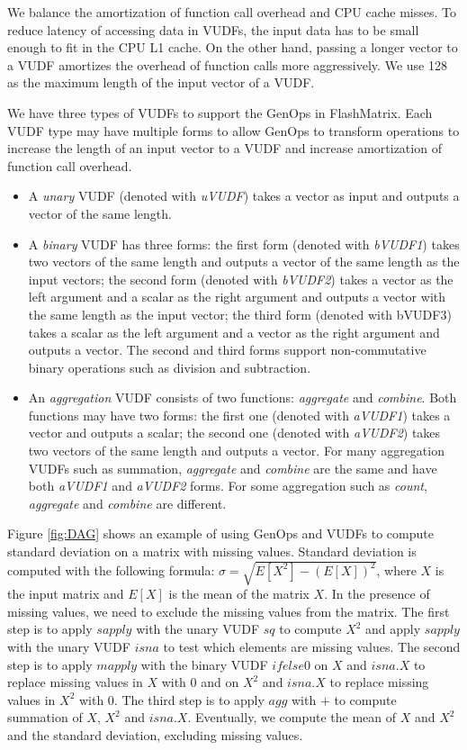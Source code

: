 We balance the amortization of function call overhead and CPU cache misses.
To reduce latency of accessing data in VUDFs,
the input data has to be small enough to fit in the CPU L1 cache. On the
other hand, passing a longer vector to a VUDF amortizes the overhead of
function calls more aggressively. We use 128 as the maximum length of
the input vector of a VUDF. %

We have three types of VUDFs to support the GenOps in FlashMatrix. Each VUDF
type may have multiple forms to allow GenOps to transform operations to
increase the length of an input vector to a VUDF and increase amortization
of function call overhead.
\begin{itemize}
	\item A \textit{unary} VUDF (denoted with \textit{uVUDF}) takes a vector
		as input and outputs a vector of the same length.
	\item A \textit{binary} VUDF has three forms: the first form (denoted with
		\textit{bVUDF1}) takes two vectors of the same length and outputs
		a vector of the same length as the input vectors; the second form (denoted
		with \textit{bVUDF2}) takes a vector as the left argument and a scalar
		as the right argument and outputs a vector with the same length as
		the input vector; the third form (denoted with bVUDF3) takes a scalar
		as the left argument and a vector as the right argument and outputs
		a vector. The second and third forms support non-commutative binary
		operations such as division and subtraction.
	\item An \textit{aggregation} VUDF consists of two functions:
		\textit{aggregate} and \textit{combine}. Both functions may have two
		forms: the first one (denoted with \textit{aVUDF1}) takes a vector and
		outputs a scalar; the second one (denoted with \textit{aVUDF2}) takes
		two vectors of the same length and outputs a vector. For many
		aggregation VUDFs such as summation, \textit{aggregate} and
		\textit{combine} are the same and have both \textit{aVUDF1} and
		\textit{aVUDF2} forms. For some aggregation such as \textit{count},
		\textit{aggregate} and \textit{combine} are different.
\end{itemize}

Figure \ref{fig:DAG} shows an example of using GenOps and VUDFs to compute
standard deviation on a matrix with missing values. Standard deviation is
computed with the following
formula: $\sigma = \sqrt{E[X^2] - (E[X])^2}$, where $X$ is the input matrix and
$E[X]$ is the mean of the matrix $X$. In the presence of missing values, we
need to exclude the missing values from the matrix. The first step is to apply
$sapply$ with the unary VUDF $sq$ to compute $X^2$ and apply $sapply$ with
the unary VUDF $isna$ to test which elements are missing values. The second
step is to apply $mapply$ with the binary VUDF $ifelse0$ on $X$ and $isna.X$
to replace missing
values in $X$ with 0 and on $X^2$ and $isna.X$ to replace missing values in
$X^2$ with 0. The third step is to apply $agg$ with $+$ to compute summation
of $X$, $X^2$ and $isna.X$. Eventually, we compute the mean of $X$ and
$X^2$ and the standard deviation, excluding missing values.

